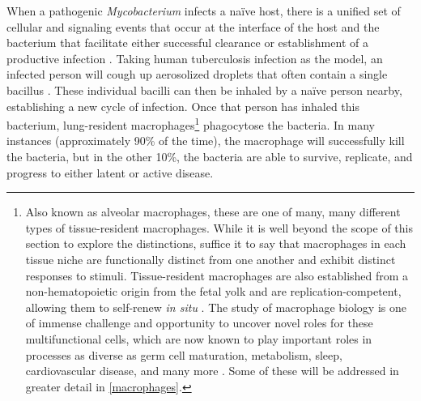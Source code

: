 When a pathogenic \textit{Mycobacterium} infects a na\"{i}ve host, there is a unified set of cellular and signaling events that occur at the interface of the host and the bacterium that facilitate either successful clearance or establishment of a productive infection \citep{Davies2001b, Bohrer2021, Gagneux2006a, Turner2017}. Taking human tuberculosis infection as the model, an infected person will cough up aerosolized droplets that often contain a single bacillus \citep{Churchyard2017, Mathema2017}. These individual bacilli can then be inhaled by a na\"{i}ve person nearby, establishing a new cycle of infection. Once that person has inhaled this bacterium, lung\hyp{}resident macrophages\footnote{Also known as alveolar macrophages, these are one of many, many different types of tissue\hyp{}resident macrophages. While it is well beyond the scope of this section to explore the distinctions, suffice it to say that macrophages in each tissue niche are functionally distinct from one another and exhibit distinct responses to stimuli. Tissue\hyp{}resident macrophages are also established from a non\hyp{}hematopoietic origin from the fetal yolk and are replication\hyp{}competent, allowing them to self\hyp{}renew \textit{in situ} \citep{Davies2013a, Davies2013b, Epelman2014, Ginhoux2014, Ginhoux2016}. The study of macrophage biology is one of immense challenge and opportunity to uncover novel roles for these multifunctional cells, which are now known to play important roles in processes as diverse as germ cell maturation, metabolism, sleep, cardiovascular disease, and many more \citep{Davies2013a, Hussell2014}. Some of these will be addressed in greater detail in \autoref{macrophages}.} phagocytose the bacteria. In many instances (approximately 90\% of the time), the macrophage will successfully kill the bacteria, but in the other 10\%, the bacteria are able to survive, replicate, and progress to either latent or active disease.

